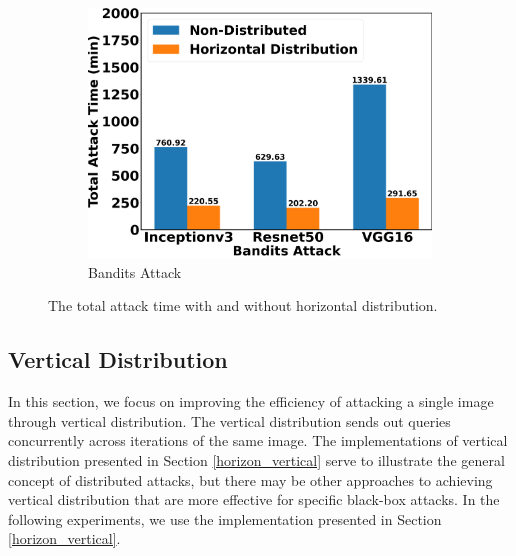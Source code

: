 \begin{figure}[tbhp]
\begin{subfigure}[b]{0.32\textwidth}
    \includegraphics[width=\textwidth]{figures/chapter_classification/bandits_attack_horizontal_time.png}
    \caption{Bandits Attack}
    \label{fig:bandits_horizon}
\end{subfigure}
\caption{The total attack time with and without horizontal distribution.}
\label{fig.horizon_time}
\end{figure}


\subsection{Vertical Distribution}

In this section, we focus on improving the efficiency of attacking a single image through vertical distribution. The vertical distribution sends out queries concurrently across iterations of the same image. The implementations of vertical distribution presented in Section \ref{horizon_vertical} serve to illustrate the general concept of distributed attacks, but there may be other approaches to achieving vertical distribution that are more effective for specific black-box attacks. In the following experiments, we use the implementation presented in Section \ref{horizon_vertical}.


